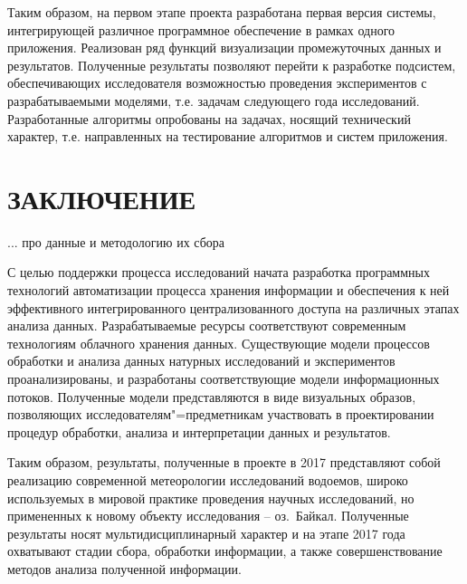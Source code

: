 \documentclass[a4paper,12pt,openany,final]{extreport}
\newcommand\theyear{2017}
\begin{document}
Таким образом, на первом этапе проекта разработана первая версия
системы, интегрирующей различное программное обеспечение в рамках одного
приложения. Реализован ряд функций визуализации промежуточных данных и
результатов. Полученные результаты позволяют перейти к разработке
подсистем, обеспечивающих исследователя возможностью проведения
экспериментов с разрабатываемыми моделями, т.е. задачам следующего года
исследований. Разработанные алгоритмы опробованы на задачах, носящий
технический характер, т.е. направленных на тестирование алгоритмов и
систем приложения.

\chapter*{ЗАКЛЮЧЕНИЕ}
\label{chap:concl}




... про данные и методологию их сбора

С целью поддержки процесса исследований начата разработка программных технологий автоматизации процесса хранения информации и обеспечения к ней эффективного интегрированного централизованного доступа на различных этапах анализа данных.  Разрабатываемые ресурсы соответствуют современным технологиям облачного хранения данных.  Существующие модели процессов обработки и анализа данных натурных исследований и экспериментов проанализированы, и разработаны соответствующие модели информационных потоков.  Полученные модели представляются в виде визуальных образов, позволяющих исследователям"=предметникам участвовать в проектировании процедур обработки, анализа и интерпретации данных и результатов.

Таким образом, результаты, полученные в проекте в \theyear{} представляют собой реализацию современной метеорологии исследований водоемов, широко используемых в мировой практике проведения научных исследований, но примененных к новому объекту исследования -- оз.~Байкал.  Полученные результаты носят мультидисциплинарный характер и на этапе \theyear{} года охватывают стадии сбора, обработки информации, а также совершенствование методов анализа полученной информации.

\appendices
\end{document}
